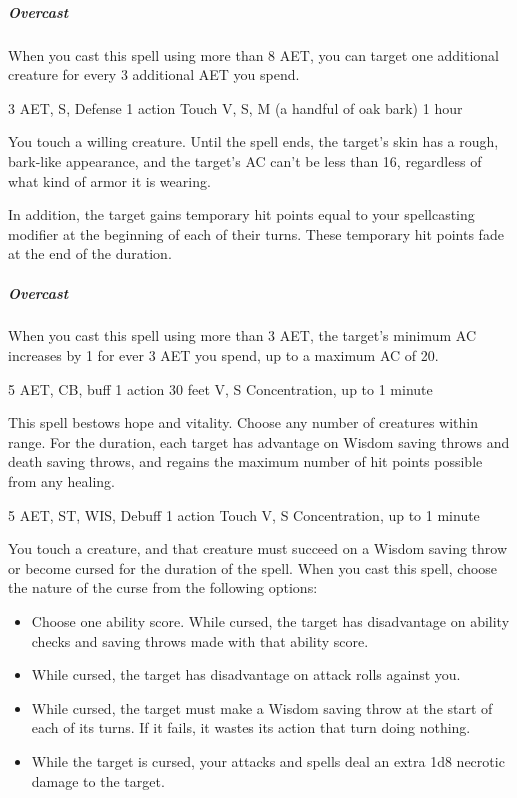 \subparagraph*{Overcast} When you cast this spell using more than 8 AET, you can target one additional creature for every 3 additional AET you spend.


{3 AET, S, Defense}
{1 action}
{Touch}
{V, S, M (a handful of oak bark)}
{1 hour}

You touch a willing creature. Until the spell ends, the target's skin has a rough, bark-like appearance, and the target's AC can't be less than 16, regardless of what kind of armor it is wearing.

In addition, the target gains temporary hit points equal to your spellcasting modifier at the beginning of each of their turns. These temporary hit points fade at the end of the duration.

\subparagraph*{Overcast} When you cast this spell using more than 3 AET, the target's minimum AC increases by 1 for ever 3 AET you spend, up to a maximum AC of 20.


{5 AET, CB, buff}
{1 action}
{30 feet}
{V, S}
{Concentration, up to 1 minute}

This spell bestows hope and vitality. Choose any number of creatures within range. For the duration, each target has advantage on Wisdom saving throws and death saving throws, and regains the maximum number of hit points possible from any healing.


{5 AET, ST, WIS, Debuff}
{1 action}
{Touch}
{V, S}
{Concentration, up to 1 minute}

You touch a creature, and that creature must succeed on a Wisdom saving throw or become cursed for the duration of the spell. When you cast this spell, choose the nature of the curse from the following options:

\begin{itemize}
\item Choose one ability score. While cursed, the target has disadvantage on ability checks and saving throws made with that ability score.
\item While cursed, the target has disadvantage on attack rolls against you.
\item While cursed, the target must make a Wisdom saving throw at the start of each of its turns. If it fails, it wastes its action that turn doing nothing.
\item While the target is cursed, your attacks and spells deal an extra 1d8 necrotic damage to the target.
\end{itemize}

